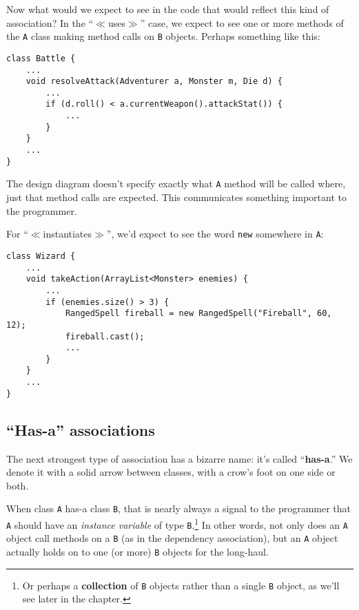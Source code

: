 Now what would we expect to see in the code that would reflect this kind of
association? In the ``$\ll$uses$\gg$'' case, we expect to see one or more
methods of the \texttt{A} class making method calls on \texttt{B} objects.
Perhaps something like this:

\begin{Verbatim}[fontsize=\scriptsize,samepage=true,frame=single]
class Battle {
    ...
    void resolveAttack(Adventurer a, Monster m, Die d) {
        ...
        if (d.roll() < a.currentWeapon().attackStat()) {
            ...
        }
    }
    ...
}
\end{Verbatim}

The design diagram doesn't specify exactly what \texttt{A} method will be
called where, just that method calls are expected. This communicates something
important to the programmer.

For ``$\ll$instantiates$\gg$'', we'd expect to see the word \texttt{new}
somewhere in \texttt{A}:

\begin{Verbatim}[fontsize=\scriptsize,samepage=true,frame=single]
class Wizard {
    ...
    void takeAction(ArrayList<Monster> enemies) {
        ...
        if (enemies.size() > 3) {
            RangedSpell fireball = new RangedSpell("Fireball", 60, 12);
            fireball.cast();
            ...
        }
    }
    ...
}
\end{Verbatim}

\subsection{``Has-a'' associations}

The next strongest type of association has a bizarre name: it's called
``\textbf{has-a}.'' We denote it with a solid arrow between classes, with a
crow's foot on one side or both.

When class \texttt{A} has-a class \texttt{B}, that is nearly always a signal
to the programmer that \texttt{A} should have an \textit{instance variable} of
type \texttt{B}.\footnote{Or perhaps a \textbf{collection} of \texttt{B}
objects rather than a single \texttt{B} object, as we'll see later in the
chapter.} In other words, not only does an \texttt{A} object call
methods on a \texttt{B} (as in the dependency association), but an \texttt{A}
object actually holds on to one (or more) \texttt{B} objects for the
long-haul.

